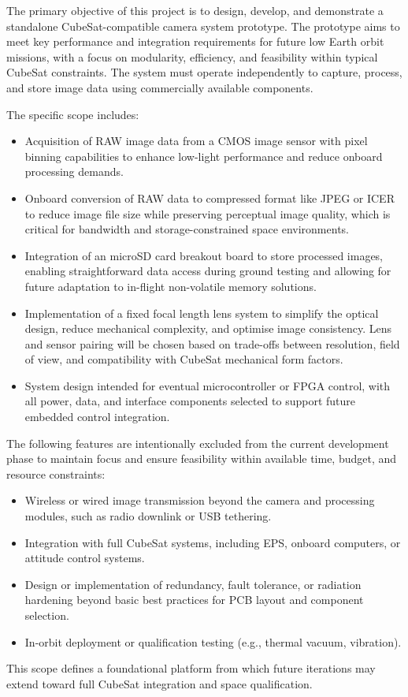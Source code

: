 The primary objective of this project is to design, develop, and demonstrate a standalone CubeSat-compatible camera system prototype. The prototype aims to meet key performance and integration requirements for future low Earth orbit missions, with a focus on modularity, efficiency, and feasibility within typical CubeSat constraints. The system must operate independently to capture, process, and store image data using commercially available components.

The specific scope includes:
\begin{itemize}
    \item Acquisition of RAW image data from a CMOS image sensor with pixel binning capabilities to enhance low-light performance and reduce onboard processing demands.
    \item Onboard conversion of RAW data to compressed format like JPEG or ICER to reduce image file size while preserving perceptual image quality, which is critical for bandwidth and storage-constrained space environments.
    \item Integration of an microSD card breakout board to store processed images, enabling straightforward data access during ground testing and allowing for future adaptation to in-flight non-volatile memory solutions.
    \item Implementation of a fixed focal length lens system to simplify the optical design, reduce mechanical complexity, and optimise image consistency. Lens and sensor pairing will be chosen based on trade-offs between resolution, field of view, and compatibility with CubeSat mechanical form factors.
    \item System design intended for eventual microcontroller or FPGA control, with all power, data, and interface components selected to support future embedded control integration.
\end{itemize}

The following features are intentionally excluded from the current development phase to maintain focus and ensure feasibility within available time, budget, and resource constraints:
\begin{itemize}
    \item Wireless or wired image transmission beyond the camera and processing modules, such as radio downlink or USB tethering.
    \item Integration with full CubeSat systems, including EPS, onboard computers, or attitude control systems.
    \item Design or implementation of redundancy, fault tolerance, or radiation hardening beyond basic best practices for PCB layout and component selection.
    \item In-orbit deployment or qualification testing (e.g., thermal vacuum, vibration).
\end{itemize}

This scope defines a foundational platform from which future iterations may extend toward full CubeSat integration and space qualification.
